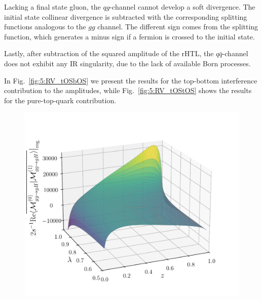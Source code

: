 Lacking a final state gluon, the $q g$-channel cannot develop a soft divergence. The initial state collinear divergence is subtracted with the corresponding splitting functions analogous to the $gg$ channel. The different sign comes from the splitting function, which generates a minus sign if a fermion is crossed to the initial state.

Lastly, after subtraction of the squared amplitude of the \acs{rHTL}, the $q \bar{q}$-channel does not exhibit any \acs{IR} singularity, due to the lack of available Born processes.

In Fig.~\ref{fig:5:RV_tOSbOS} we present the results for the top-bottom interference contribution to the amplitudes, while Fig.~\ref{fig:5:RV_tOStOS} shows the results for the pure-top-quark contribution.
\begin{figure}[ht]
  \begin{minipage}[t]{0.49\textwidth}
  \centering
  \includegraphics[width=\textwidth]{Images/RV_amplitudes/tOSbOS_gg.pdf}
  \end{minipage}
  \begin{minipage}[t]{0.49\textwidth}
  \centering

\end{minipage}
\end{figure}
